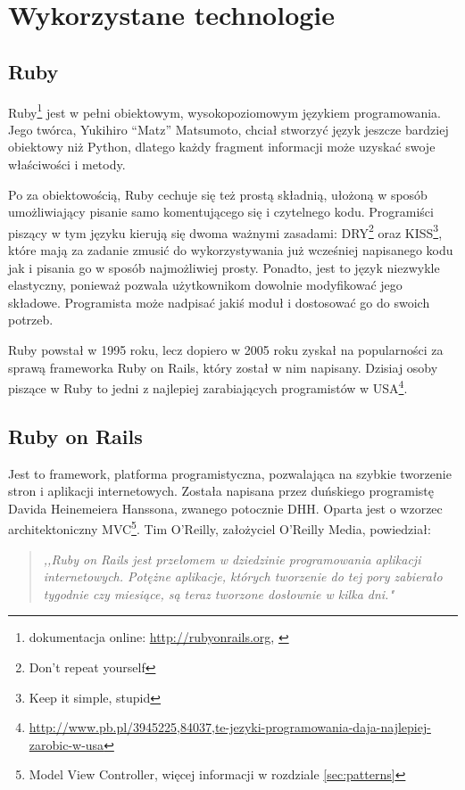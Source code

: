 \section{Wykorzystane technologie}
  \subsection{Ruby}
  \label{sec:Ruby}
  Ruby\footnote{dokumentacja online: \url{http://rubyonrails.org}, \cite{ruby_lang}} jest w pełni obiektowym, wysokopoziomowym językiem programowania. Jego twórca, Yukihiro “Matz” Matsumoto, chciał stworzyć język jeszcze bardziej obiektowy niż Python, dlatego każdy fragment informacji może uzyskać swoje właściwości i metody.

  Po za obiektowością, Ruby cechuje się też prostą składnią, ułożoną w sposób umożliwiający pisanie samo komentującego się i czytelnego kodu. Programiści piszący w tym języku kierują się dwoma ważnymi zasadami: DRY\footnote{Don't repeat yourself\cite{programming_ruby}} oraz KISS\footnote{Keep it simple, stupid\cite{programming_ruby}}, które mają za zadanie zmusić do wykorzystywania już wcześniej napisanego kodu jak i pisania go w sposób najmożliwiej prosty. Ponadto, jest to język niezwykle elastyczny, ponieważ pozwala użytkownikom dowolnie modyfikować jego składowe. Programista może nadpisać jakiś moduł i dostosować go do swoich potrzeb.

  Ruby powstał w 1995 roku, lecz dopiero w 2005 roku zyskał na popularności za sprawą frameworka Ruby on Rails, który został w nim napisany. Dzisiaj osoby piszące w Ruby to jedni z najlepiej zarabiających programistów w USA\footnote{\url{http://www.pb.pl/3945225,84037,te-jezyki-programowania-daja-najlepiej-zarobic-w-usa}}.

  \subsection{Ruby on Rails}
  \label{sec:Rails}
  Jest to framework, platforma programistyczna, pozwalająca na szybkie tworzenie stron i aplikacji internetowych. Została napisana przez duńskiego programistę Davida Heinemeiera Hanssona, zwanego potocznie DHH. Oparta jest o wzorzec architektoniczny MVC\footnote{Model View Controller, więcej informacji w rozdziale \ref{sec:patterns}}.
  \clearpage
  Tim O'Reilly, założyciel O'Reilly Media, powiedział:
  \begin{quote}
    \emph{,,Ruby on Rails jest przełomem w dziedzinie programowania aplikacji internetowych.
    Potężne aplikacje, których tworzenie do tej pory zabierało tygodnie czy miesiące, są teraz tworzone dosłownie w kilka dni."}
  \end{quote}

